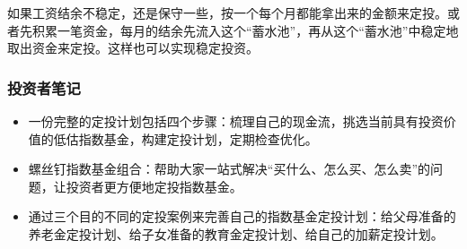 如果工资结余不稳定，还是保守一些，按一个每个月都能拿出来的金额来定投。或者先积累一笔资金，每月的结余先流入这个“蓄水池”，再从这个“蓄水池”中稳定地取出资金来定投。这样也可以实现稳定投资。

\subsubsection{投资者笔记}

\begin{itemize}
\item {\kaishu 一份完整的定投计划包括四个步骤：梳理自己的现金流，挑选当前具有投资价值的低估指数基金，构建定投计划，定期检查优化。}
\item {\kaishu 螺丝钉指数基金组合：帮助大家一站式解决“买什么、怎么买、怎么卖”的问题，让投资者更方便地定投指数基金。}
\item {\kaishu 通过三个目的不同的定投案例来完善自己的指数基金定投计划：给父母准备的养老金定投计划、给子女准备的教育金定投计划、给自己的加薪定投计划。}
\end{itemize}


